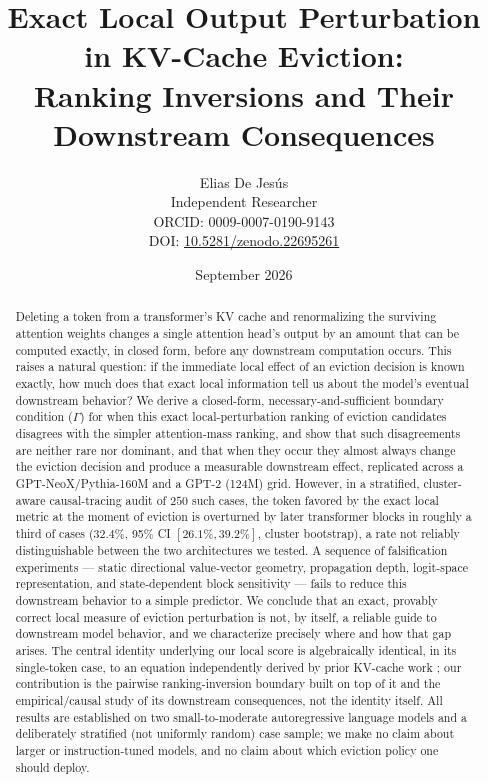 \documentclass[11pt]{article}
\title{Exact Local Output Perturbation in KV-Cache Eviction:\\
Ranking Inversions and Their Downstream Consequences}
\author{Elias De Jesús\\
\small Independent Researcher\\
\small ORCID: 0009-0007-0190-9143\\
\small DOI: \href{https://doi.org/10.5281/zenodo.22695261}{10.5281/zenodo.22695261}}
\date{September 2026}
\begin{document}
\maketitle

\begin{abstract}
Deleting a token from a transformer's KV cache and renormalizing the surviving
attention weights changes a single attention head's output by an amount that
can be computed exactly, in closed form, before any downstream computation
occurs. This raises a natural question: if the immediate local effect of an
eviction decision is known exactly, how much does that exact local
information tell us about the model's eventual downstream behavior? We
derive a closed-form, necessary-and-sufficient boundary condition ($\Gamma$)
for when this exact local-perturbation ranking of eviction candidates
disagrees with the simpler attention-mass ranking, and show that such
disagreements are neither rare nor dominant, and that when they occur they
almost always change the eviction decision and produce a measurable
downstream effect, replicated across a GPT-NeoX/Pythia-160M and a GPT-2
(124M) grid. However, in a stratified, cluster-aware causal-tracing audit of
$250$ such cases, the token favored by the exact local metric at the moment
of eviction is overturned by later transformer blocks in roughly a third of
cases ($32.4\%$, 95\% CI $[26.1\%,39.2\%]$, cluster bootstrap), a rate not
reliably distinguishable between the two architectures we tested. A sequence
of falsification experiments --- static directional value-vector geometry,
propagation depth, logit-space representation, and state-dependent block
sensitivity --- fails to reduce this downstream behavior to a simple
predictor. We conclude that an exact, provably correct local measure of
eviction perturbation is not, by itself, a reliable guide to downstream
model behavior, and we characterize precisely where and how that gap arises.
The central identity underlying our local score is algebraically identical,
in its single-token case, to an equation independently derived by prior
KV-cache work \cite{keepkv2025}; our contribution is the pairwise
ranking-inversion boundary built on top of it and the empirical/causal study
of its downstream consequences, not the identity itself. All results are
established on two small-to-moderate autoregressive language models and a
deliberately stratified (not uniformly random) case sample; we make no claim
about larger or instruction-tuned models, and no claim about which eviction
policy one should deploy.
\end{abstract}
\end{document}
